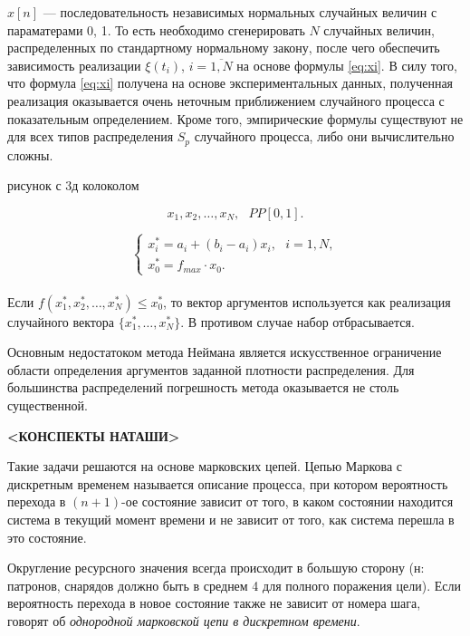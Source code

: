 \documentclass[12pt]{article}
\begin{document}
$x[n]$ --- последовательность независимых нормальных случайных величин с параматерами 0, 1. То есть необходимо сгенерировать $N$ случайных величин, распределенных по стандартному нормальному закону, после чего обеспечить зависимость реализации $\xi(t_i)$, $i = \overline{1, N}$ на основе формулы 
\eqref{eq:xi}. В силу того, что формула \eqref{eq:xi} получена на основе экспериментальных данных, полученная реализация оказывается очень неточным приближением случайного процесса с показательным определением. Кроме того, эмпирические формулы существуют не для всех типов распределения $S_p$ случайного процесса, либо они вычислительно сложны.

\begin{center} рисунок с 3д колоколом \end{center}

\[ x_1, x_2, \ldots, x_N,~~~PP[0,1].\]

\[
\begin{cases}
    x_i^* = a_i + (b_i - a_i) x_i, ~~~i = 1,N,\\
    x_0^* = f_{max} \cdot x_0.
\end{cases}
\]\\

Если $f(x_1^*, x_2^*, \ldots, x_N^*) \leq x_0^*$, то вектор аргументов используется как реализация случайного вектора $\{ x_1^*, \ldots, x_N^* \}$. В противом случае набор отбрасывается.

Основным недостатоком метода Неймана является искусственное ограничение области определения аргументов заданной плотности распределения. Для большинства распределений погрешность метода оказывается не столь существенной.\\

\newpage
\null
\vfill
\begin{center}
\textbf{<КОНСПЕКТЫ НАТАШИ>}
\end{center}
\vfill
\newpage

Такие задачи решаются на основе марковских цепей. Цепью Маркова с дискретным временем называется описание процесса, при котором вероятность перехода в $(n+1)$-ое состояние зависит от того, в каком состоянии находится система в текущий момент времени и не зависит от того, как система перешла в это состояние.

Округление ресурсного значения всегда происходит в большую сторону (н: патронов, снарядов должно быть в среднем 4 для полного поражения цели). Если вероятность перехода в новое состояние также не зависит от номера шага, говорят об \emph{однородной марковской цепи в дискретном времени}. 
\end{document}
